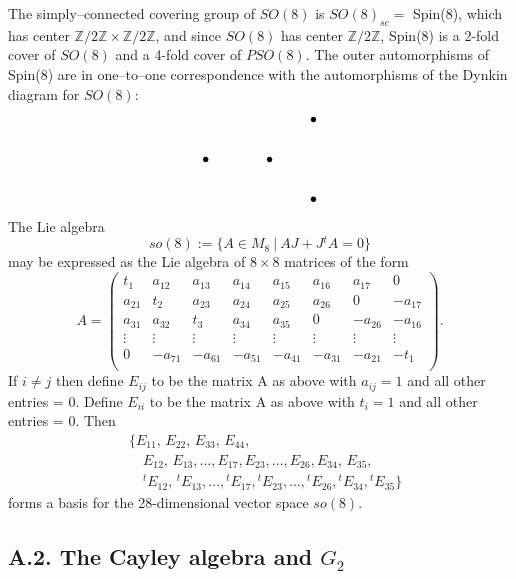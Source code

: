 \documentclass[12pt,letterpaper]{amsart}
\newcommand{\zzz}{\mathbb{Z}}
\begin{document}
The simply--connected covering group of $SO(8)$ is
$SO(8)_{sc} =$ Spin(8), which has center $\zzz /2\zzz \times \zzz /2\zzz$,
and since $SO(8)$ has center $\zzz /2\zzz$, Spin(8) is a 2-fold cover
of $SO(8)$ and a 4-fold cover of $PSO(8)$. The outer automorphisms
of Spin(8) are in one--to--one correspondence with the automorphisms
of the Dynkin diagram for $SO(8)$:
\[
\begin{tikzpicture}[baseline=(c.base)]
\node (c) at (0,0) {$\bullet$};
\node at (-1.6,0) {$\bullet$};
\node at (1.1,1.0) {$\bullet$};
\node at (1.1,-1.0) {$\bullet$};
\end{tikzpicture}
\]
The Lie algebra
\[
so(8) := \{A \in M_8\ |\ AJ + J{}^{t}A = 0\}
\]
may be expressed as the Lie algebra of $8\times 8$ matrices of the
form
\[
A =  {\begin{pmatrix} t_{1}&a_{12}&a_{13}&a_{14}&a_{15}&a_{16}&a_{17}&0\\
a_{21}&t_2&a_{23}&a_{24}&a_{25}&a_{26}&0&-a_{17}\\
a_{31}&a_{32}&t_3&a_{34}&a_{35}&0&-a_{26}&-a_{16}\\
\vdots&\vdots &\vdots &\vdots &\vdots &\vdots &\vdots &\vdots\\
0&-a_{71}&-a_{61}&-a_{51}&-a_{41}&-a_{31}&-a_{21}&-t_1\\
\end{pmatrix}}.\tag{A.2}
\]
If $i \not= j$ then define $E_{ij}$ to be the matrix A as above with
$a_{ij} = 1$ and all other entries = 0. Define $E_{ii}$ to be the
matrix A as above with $t_i = 1$ and all other entries = 0. Then
\[
\begin{split}
&\big\{ E_{11},\,  E_{22},\, E_{33},\, E_{44},\\
&\quad E_{12},\, E_{13},\dots ,E_{17},
       E_{23},\dots ,E_{26},
       E_{34},\, E_{35},\\
&\quad {{}^{t}E_{12}},\, {{}^{t}E_{13}},\dots ,{{}^{t}E_{17}},
       {{}^{t}E_{23}},\dots ,{{}^{t}E_{26}},
       {{}^{t}E_{34}},{{}^{t}E_{35}} \big\}
\end{split}\tag{A.3}
\]
forms a basis
for the 28-dimensional vector space $so(8)$.

\subsection*{A.2. The Cayley algebra and $G_2$}
\end{document}
